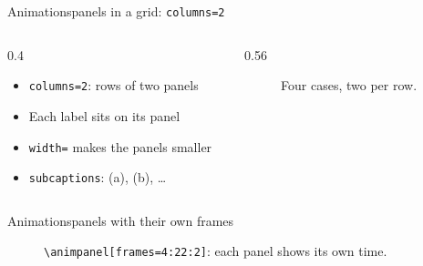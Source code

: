 \begin{frame}{Animations}{panels in a grid: \texttt{columns=2}}
  \begin{columns}[c]
    \begin{column}{0.4\textwidth}
      \begin{itemize}
        \item \texttt{columns=2}: rows of two panels
        \item Each label sits on its panel
        \item \texttt{width=} makes the panels smaller
        \item \texttt{subcaptions}: (a), (b), \ldots
      \end{itemize}
    \end{column}
    \begin{column}{0.56\textwidth}
      \begin{figure}
        \begin{animation}[fps=4, frames=0:22:2, columns=2, width=0.35\linewidth,
                          subcaptions, dt=0.1, timelabel={$\tau = $}]
        \end{animation}
        \caption{Four cases, two per row.}
      \end{figure}
    \end{column}
  \end{columns}
\end{frame}

\begin{frame}{Animations}{panels with their own frames}
  \begin{figure}
    \begin{animation}[fps=4, frames=0:22:2, dt=0.1, timebar, controls=hover]
    \end{animation}
    \caption{\texttt{\textbackslash animpanel[frames=4:22:2]}: each panel shows its own time.}
  \end{figure}
\end{frame}

